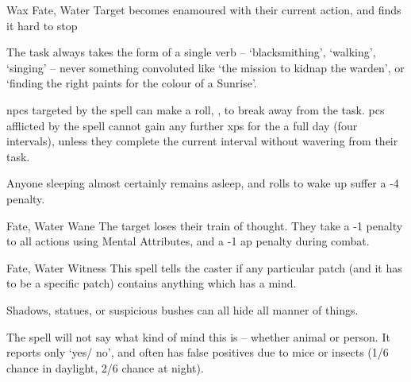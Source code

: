   {}%
  {Wax}%
  {Fate, Water}%
  {}%
  {Target becomes enamoured with their current action, and finds it hard to stop}%
  {
    The task always takes the form of a single verb -- `blacksmithing', `walking', `singing' -- never something convoluted like `the mission to kidnap the warden', or `finding the right paints for the colour of a Sunrise'.

    \Glspl{npc} targeted by the spell can make a  roll, \tn[8], to break away from the task.
    \Glspl{pc} afflicted by the spell cannot gain any further \glspl{xp} for the a full day (four \glspl{interval}), unless they complete the current \gls{interval} without wavering from their task.

  Anyone sleeping almost certainly remains asleep, and rolls to wake up suffer a -4 penalty.}

  {Fate, Water}%
  {Wane}%
  {}%
  {}%
  {The target loses their train of thought.
    They take a -1 penalty to all actions using Mental Attributes, and a -1 \gls{ap} penalty during combat.}%
  {}

  {Fate, Water}%
  {Witness}%
  {}%
  {}%
  {This spell tells the caster if any particular patch (and it has to be a specific patch) contains anything which has a mind.}%
  {Shadows, statues, or suspicious bushes can all hide all manner of things.

    The spell will not say what kind of mind this is -- whether animal or person.
    It reports only `yes/ no', and often has false positives due to mice or insects (1/6 chance in daylight, 2/6 chance at night).}
